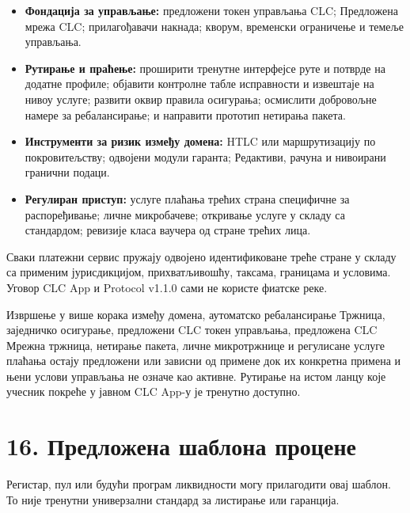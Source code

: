 \documentclass[11pt]{article}
\begin{document}
\begin{itemize}[leftmargin=*]
\item \textbf{Фондација за управљање:} предложени токен управљања CLC; Предложена мрежа CLC; прилагођавачи накнада; кворум, временски ограничење и темеље управљања.
\item \textbf{Рутирање и праћење:} проширити тренутне интерфејсе руте и потврде на додатне профиле; објавити контролне табле исправности и извештаје на нивоу услуге; развити оквир правила осигурања; осмислити добровољне намере за ребалансирање; и направити прототип нетирања пакета.
\item \textbf{Инструменти за ризик између домена:} HTLC или маршрутизацију по покровитељству; одвојени модули гаранта; Редактиви, рачуна и нивоирани гранични подаци.
\item \textbf{Регулиран приступ:} услуге плаћања трећих страна специфичне за распоређивање; личне микробачеве; откривање услуге у складу са стандардом; ревизије класа ваучера од стране трећих лица.
\end{itemize}
Сваки платежни сервис пружају одвојено идентификоване треће стране у складу са применим јурисдикцијом, прихватљивошћу, таксама, границама и условима. Уговор CLC App и Protocol v1.1.0 сами не користе фиатске реке.

Извршење у више корака између домена, аутоматско ребалансирање Тржница, заједничко осигурање, предложени CLC токен управљања, предложена CLC Мрежна тржница, нетирање пакета, личне микротржнице и регулисане услуге плаћања остају предложени или зависни од примене док их конкретна примена и њени услови управљања не означе као активне. Рутирање на истом ланцу које учесник покреће у јавном CLC App-у је тренутно доступно.


\section*{16. Предложена шаблона процене}

Регистар, пул или будући програм ликвидности могу прилагодити овај шаблон. То није тренутни универзални стандард за листирање или гаранција.
\end{document}
